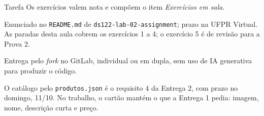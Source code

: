 \documentclass{beamer}
\begin{document}
\begin{frame}{Tarefa}
	Os exercícios valem nota e compõem o item \emph{Exercícios em sala}.

	\vspace{0.3cm}
	Enunciado no \texttt{README.md} de \texttt{ds122-lab-02-assignment}; prazo
	na UFPR Virtual. As paradas desta aula cobrem os exercícios 1 a 4; o
	exercício 5 é de revisão para a Prova 2.

	\vspace{0.3cm}
	Entrega pelo \emph{fork} no GitLab, individual ou em dupla, sem uso de IA
	generativa para produzir o código.

	\vspace{0.5cm}
	O catálogo pelo \texttt{produtos.json} é o requisito 4 da Entrega 2, com
	prazo no domingo, 11/10. No trabalho, o cartão mantém o que a Entrega 1
	pedia: imagem, nome, descrição curta e preço.
\end{frame}
\end{document}
